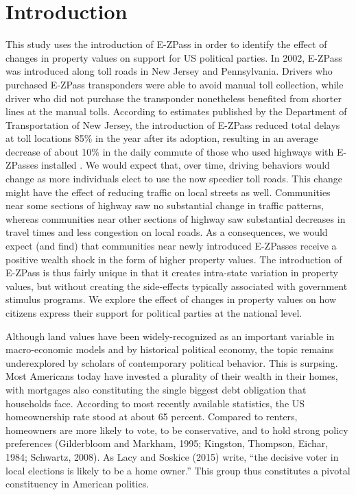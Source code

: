 \section{Introduction}
This study uses the introduction of E-ZPass in order to identify the effect of changes in property values on support for US political parties. In 2002, E-ZPass was introduced along toll roads in New Jersey and Pennsylvania. Drivers who purchased E-ZPass transponders were able to avoid manual toll collection, while driver who did not purchase the transponder nonetheless benefited from shorter lines at the manual tolls. According to estimates published by the Department of Transportation of New Jersey, the introduction of E-ZPass reduced total delays at toll locations 85\% in the year after its adoption, resulting in an average decrease of about 10\% in the daily commute of those who used highways with E-ZPasses installed \parencite{NJT2001}. We would expect that, over time, driving behaviors would change as more individuals elect to use the now speedier toll roads. This change might have the effect of reducing traffic on local streets as well. Communities near some sections of highway saw no substantial change in traffic patterns, whereas communities near other sections of highway saw substantial decreases in travel times and less congestion on local roads. As a consequences, we would expect (and find) that communities near newly introduced E-ZPasses receive a positive wealth shock in the form of higher property values. The introduction of E-ZPass is thus fairly unique in that it creates intra-state variation in property values, but without creating the side-effects typically associated with government stimulus programs. We explore the effect of changes in property values on how citizens express their support for political parties at the national level.

Although land values have been widely-recognized as an important variable in macro-economic models and by historical political economy, the topic remains underexplored by scholars of contemporary political behavior. This is surpsing. Most Americans today have invested a plurality of their wealth in their homes, with mortgages also constituting the single biggest debt obligation that households face. According to most recently available statistics, the US homeownership rate stood at about 65 percent. Compared to renters, homeowners are more likely to vote, to be conservative, and to hold strong policy preferences (Gilderbloom and Markham, 1995; Kingston, Thompson, Eichar, 1984; Schwartz, 2008). As Lacy and Soskice (2015) write, ``the decisive voter in local elections is likely to be a home owner.'' This group thus constitutes a pivotal constituency in American politics. 

